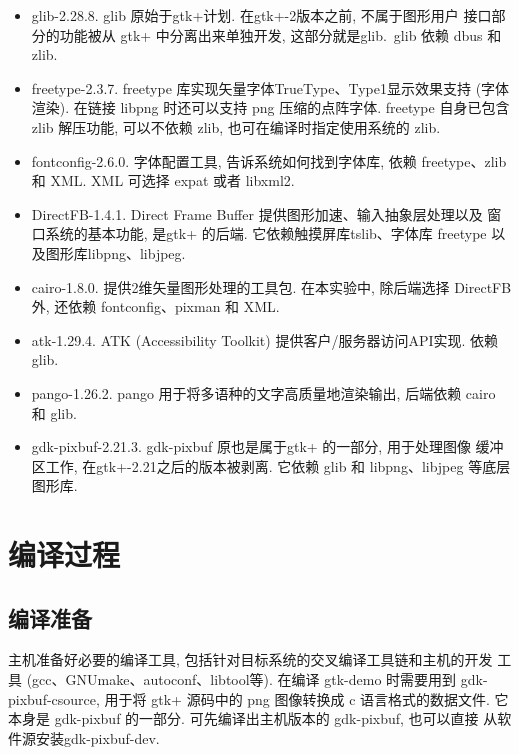 \begin{itemize}
  \item glib-2.28.8. glib 原始于gtk+计划. 在gtk+-2版本之前, 不属于图形用户
      接口部分的功能被从 gtk+ 中分离出来单独开发, 这部分就是glib.\ glib 依赖
      dbus 和 zlib.

  \item freetype-2.3.7. freetype 库实现矢量字体TrueType、Type1显示效果支持
      (字体渲染). 在链接 libpng 时还可以支持 png 压缩的点阵字体. freetype
      自身已包含 zlib 解压功能, 可以不依赖 zlib, 也可在编译时指定使用系统的
      zlib.

  \item fontconfig-2.6.0. 字体配置工具, 告诉系统如何找到字体库, 依赖
      freetype、zlib 和 XML. XML 可选择 expat 或者 libxml2.

  \item DirectFB-1.4.1. Direct Frame Buffer 提供图形加速、输入抽象层处理以及
      窗口系统的基本功能, 是gtk+ 的后端. 它依赖触摸屏库tslib、字体库 freetype
      以及图形库libpng、libjpeg.

  \item cairo-1.8.0. 提供2维矢量图形处理的工具包. 在本实验中, 除后端选择
      DirectFB外, 还依赖 fontconfig、pixman 和 XML.\@

  \item atk-1.29.4. ATK (Accessibility Toolkit) 提供客户/服务器访问API实现.
      依赖 glib.

  \item pango-1.26.2. pango 用于将多语种的文字高质量地渲染输出, 后端依赖
      cairo 和 glib.

  \item gdk-pixbuf-2.21.3. gdk-pixbuf 原也是属于gtk+ 的一部分, 用于处理图像
      缓冲区工作, 在gtk+-2.21之后的版本被剥离. 它依赖 glib 和 libpng、libjpeg
      等底层图形库.
\end{itemize}

\section{编译过程}
\subsection{编译准备}
    主机准备好必要的编译工具, 包括针对目标系统的交叉编译工具链和主机的开发
工具 (gcc、GNUmake、autoconf、libtool等). 在编译 gtk-demo 时需要用到
gdk-pixbuf-csource, 用于将 gtk+ 源码中的 png 图像转换成 c 语言格式的数据文件.
它本身是 gdk-pixbuf 的一部分. 可先编译出主机版本的 gdk-pixbuf, 也可以直接
从软件源安装gdk-pixbuf-dev.

